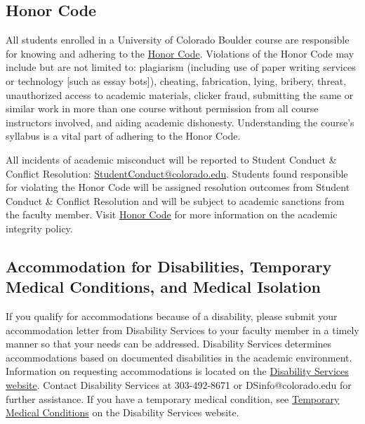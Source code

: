 \subsection*{Honor Code}

All students enrolled in a University of Colorado Boulder course are responsible for knowing and adhering to the \href{https://www.colorado.edu/sccr/students/honor-code-and-student-code-conduct}{Honor Code}. Violations of the Honor Code may include but are not limited to: plagiarism (including use of paper writing services or technology [such as essay bots]), cheating, fabrication, lying, bribery, threat, unauthorized access to academic materials, clicker fraud, submitting the same or similar work in more than one course without permission from all course instructors involved, and aiding academic dishonesty. Understanding the course's syllabus is a vital part of adhering to the Honor Code.

All incidents of academic misconduct will be reported to Student Conduct \& Conflict Resolution: \href{mailto:StudentConduct@colorado.edu}{StudentConduct@colorado.edu}. Students found responsible for violating the Honor Code will be assigned resolution outcomes from Student Conduct \& Conflict Resolution and will be subject to academic sanctions from the faculty member. Visit \href{https://www.colorado.edu/sccr/students/honor-code-and-student-code-conduct}{Honor Code} for more information on the academic integrity policy.

\subsection*{Accommodation for Disabilities, Temporary Medical Conditions, and Medical Isolation}

If you qualify for accommodations because of a disability, please submit your accommodation letter from Disability Services to your faculty member in a timely manner so that your needs can be addressed. Disability Services determines accommodations based on documented disabilities in the academic environment. Information on requesting accommodations is located on the \href{https://www.colorado.edu/disabilityservices/}{Disability Services website}. Contact Disability Services at 303-492-8671 or DSinfo@colorado.edu for further assistance. If you have a temporary medical condition, see \href{https://www.colorado.edu/disabilityservices/students/temporary-medical-conditions}{Temporary Medical Conditions} on the Disability Services website.

